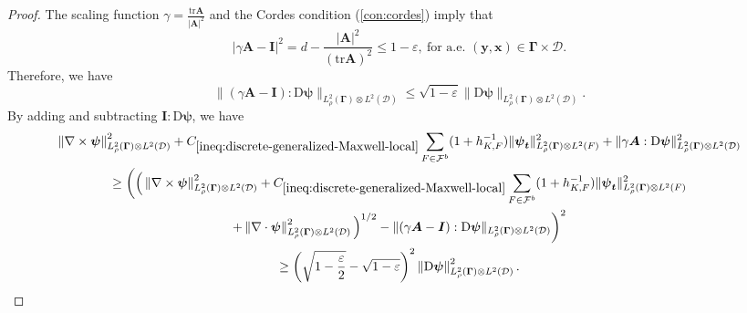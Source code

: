 \documentclass[final,onefignum,onetabnum]{mousaviart}
\begin{document}
	\vspace*{1mm}
	\begin{proof}
		The scaling function  $\gamma= \frac{\text{tr} \boldsymbol{A}}{\lvert \boldsymbol{A} \rvert^2}$ and the Cordes condition (\ref{con:cordes}) imply that
		\begin{equation}
			\label{ineq:discrete-gammaA-I}
			\lvert \gamma \boldsymbol{A} - \boldsymbol{I} \rvert^2 =
			d - \dfrac{\lvert \boldsymbol{A} \rvert^2}{\left( \text{tr} \boldsymbol{A} \right)^2 }
			\leq
			1-\varepsilon ,
			~ \text{for a.e. } (\boldsymbol{y}, \boldsymbol{x}) \in \boldsymbol{\Gamma} \times  \mathcal{D}. 
		\end{equation}
		Therefore, we have
		\begin{equation}
			\label{ineq:discrete-gammaA-Laplac}
			\lVert \left( \gamma \boldsymbol{A} - \boldsymbol{I} \right) : \mathrm{D} \boldsymbol{\psi} \rVert_{L^2_{\rho}(\boldsymbol{\Gamma}) \otimes L^2(\mathcal{D})}
			\leq \sqrt{1- \varepsilon} 
			\lVert \mathrm{D} \boldsymbol{\psi} \rVert_{L^2_{\rho}(\boldsymbol{\Gamma}) \otimes L^2(\mathcal{D})} .
		\end{equation}
		By adding and subtracting $\boldsymbol{I}: \mathrm{D} \boldsymbol{\psi}$, we have
		\begin{multline}
			\label{ineq:discrete-l-h-s-local}
			\left\| \nabla \times \boldsymbol{\psi} \right\|^2_{ L^2_{\rho}(\boldsymbol{\Gamma}) \otimes L^2(\mathcal{D})} 
			+
			C_{\ref{ineq:discrete-generalized-Maxwell-local}}
			\sum_{F \in \mathcal{F}^b}
			(1+ h_{K,F}^{-1})
			\lVert \boldsymbol{\psi}_{\boldsymbol{t}} \rVert^2_{L^2_{\rho}(\boldsymbol{\Gamma}) \otimes L^2(F)}
			+
			\lVert \gamma \boldsymbol{A}:\mathrm{D} \boldsymbol{\psi} \rVert^2_{L^2_{\rho}(\boldsymbol{\Gamma}) \otimes L^2(\mathcal{D})}
			\\
			\geq
			\bigg( 
				\Big(			
				\left\| \nabla \times \boldsymbol{\psi} \right\|^2_{L^2_{\rho}(\boldsymbol{\Gamma}) \otimes L^2(\mathcal{D})} 
				+
				C_{\ref{ineq:discrete-generalized-Maxwell-local}}
				\sum_{F \in \mathcal{F}^b}
				(1+ h_{K,F}^{-1}) 
				\lVert \boldsymbol{\psi}_{\boldsymbol{t}} \rVert^2_{ L^2_{\rho}(\boldsymbol{\Gamma}) \otimes L^2(F)}
				\\
				+
				\left\| \nabla \cdot \boldsymbol{\psi} \right\|^2_{ L^2_{\rho}(\boldsymbol{\Gamma}) \otimes L^2(\mathcal{D})}
			\Big)^{1/2} 
			-
			\lVert \left( \gamma \boldsymbol{A} - \boldsymbol{I} \right) : \mathrm{D} \boldsymbol{\psi} \rVert_{L^2_{\rho}(\boldsymbol{\Gamma}) \otimes L^2(\mathcal{D})}
			\bigg)^2
			\\
			\geq
			\left( \sqrt{1-\frac{\varepsilon}{2}} - \sqrt{1- \varepsilon}\right)^2 
			\left\| \mathrm{D} \boldsymbol{\psi} \right\|^2_{L^2_{\rho}(\boldsymbol{\Gamma}) \otimes L^2(\mathcal{D})}.
		\end{multline}
	\end{proof}
	
\end{document}
